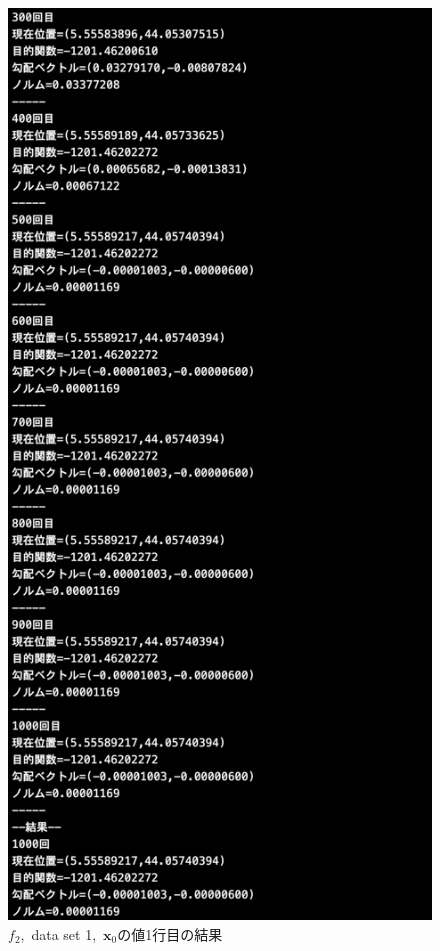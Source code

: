 \documentclass[12pt]{jarticle}
\begin{document}
\begin{figure}[h]
\begin{minipage}{0.5\hsize}
    \end{minipage}
    \begin{minipage}{0.5\hsize}
        \begin{center}
            \includegraphics[scale=0.2]{kadai1_2s_out1_1_3.png}
        \end{center}
    \end{minipage}
    \caption{$f_2$,\ data set 1,\ $\boldsymbol{x}_0$の値1行目の結果}
\end{figure}
\end{document}
